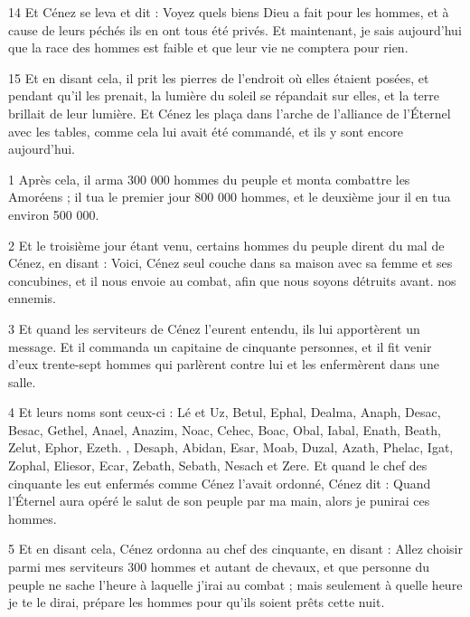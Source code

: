 \par 14 Et Cénez se leva et dit : Voyez quels biens Dieu a fait pour les hommes, et à cause de leurs péchés ils en ont tous été privés. Et maintenant, je sais aujourd’hui que la race des hommes est faible et que leur vie ne comptera pour rien.

\par 15 Et en disant cela, il prit les pierres de l'endroit où elles étaient posées, et pendant qu'il les prenait, la lumière du soleil se répandait sur elles, et la terre brillait de leur lumière. Et Cénez les plaça dans l'arche de l'alliance de l'Éternel avec les tables, comme cela lui avait été commandé, et ils y sont encore aujourd'hui.


\par 1 Après cela, il arma 300 000 hommes du peuple et monta combattre les Amoréens ; il tua le premier jour 800 000 hommes, et le deuxième jour il en tua environ 500 000.

\par 2 Et le troisième jour étant venu, certains hommes du peuple dirent du mal de Cénez, en disant : Voici, Cénez seul couche dans sa maison avec sa femme et ses concubines, et il nous envoie au combat, afin que nous soyons détruits avant. nos ennemis.

\par 3 Et quand les serviteurs de Cénez l'eurent entendu, ils lui apportèrent un message. Et il commanda un capitaine de cinquante personnes, et il fit venir d'eux trente-sept hommes qui parlèrent contre lui et les enfermèrent dans une salle.

\par 4 Et leurs noms sont ceux-ci : Lé et Uz, Betul, Ephal, Dealma, Anaph, Desac, Besac, Gethel, Anael, Anazim, Noac, Cehec, Boac, Obal, Iabal, Enath, Beath, Zelut, Ephor, Ezeth. , Desaph, Abidan, Esar, Moab, Duzal, Azath, Phelac, Igat, Zophal, Eliesor, Ecar, Zebath, Sebath, Nesach et Zere. Et quand le chef des cinquante les eut enfermés comme Cénez l'avait ordonné, Cénez dit : Quand l'Éternel aura opéré le salut de son peuple par ma main, alors je punirai ces hommes.

\par 5 Et en disant cela, Cénez ordonna au chef des cinquante, en disant : Allez choisir parmi mes serviteurs 300 hommes et autant de chevaux, et que personne du peuple ne sache l'heure à laquelle j'irai au combat ; mais seulement à quelle heure je te le dirai, prépare les hommes pour qu'ils soient prêts cette nuit.

